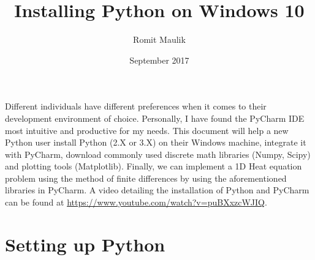 \documentclass{article}
\title{Installing Python on Windows 10}
\author{Romit Maulik}
\date{September 2017}
\begin{document}
\maketitle

Different individuals have different preferences when it comes to their development environment of choice. Personally, I have found the PyCharm IDE most intuitive and productive for my needs. This document will help a new Python user install Python (2.X or 3.X) on their Windows machine, integrate it with PyCharm, download commonly used discrete math libraries (Numpy, Scipy) and plotting tools (Matplotlib). Finally, we can implement a 1D Heat equation problem using the method of finite differences by using the aforementioned libraries in PyCharm. A video detailing the installation of Python and PyCharm can be found at \url{https://www.youtube.com/watch?v=puBXxzcWJIQ}.

\section{Setting up Python}
\end{document}
